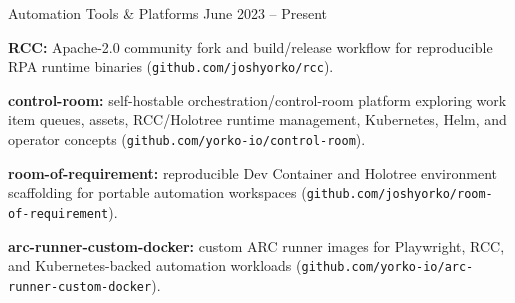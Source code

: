 


\begin{cventries}


\cventry
{Automation Tools \& Platforms} %
{} %
{} %
{June 2023 -- Present} %
{ %
	\begin{cvitems}
		\item {\textbf{RCC:} Apache-2.0 community fork and build/release workflow for reproducible RPA runtime binaries (\texttt{github.com/joshyorko/rcc}).}
		\item {\textbf{control-room:} self-hostable orchestration/control-room platform exploring work item queues, assets, RCC/Holotree runtime management, Kubernetes, Helm, and operator concepts (\texttt{github.com/yorko-io/control-room}).}
		\item {\textbf{room-of-requirement:} reproducible Dev Container and Holotree environment scaffolding for portable automation workspaces (\texttt{github.com/joshyorko/room-of-requirement}).}
		\item {\textbf{arc-runner-custom-docker:} custom ARC runner images for Playwright, RCC, and Kubernetes-backed automation workloads (\texttt{github.com/yorko-io/arc-runner-custom-docker}).}
	\end{cvitems}
}


\end{cventries}
